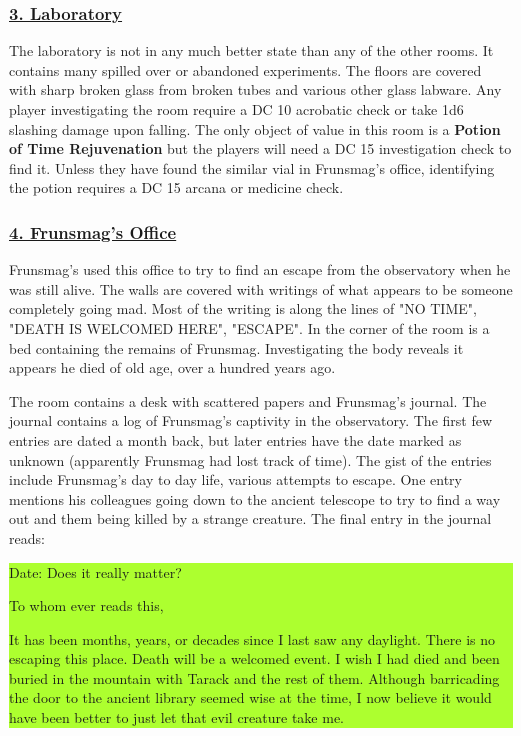 \documentclass{article}
\begin{document}
\begin{multicols*}{2}
	\subsubsection*{\underline{3. Laboratory}}
	The laboratory is not in any much better state than any of the other rooms. It contains many spilled over or abandoned experiments. The floors are covered with sharp broken glass from broken tubes and various other glass labware. Any player investigating the room require a DC 10 acrobatic check or take 1d6 slashing damage upon falling. The only object of value in this room is a \textbf{Potion of Time Rejuvenation} but the players will need a DC 15 investigation check to find it. Unless they have found the similar vial in Frunsmag's office, identifying the potion requires a DC 15 arcana or medicine check. 
	
	\subsubsection*{\underline{4. Frunsmag's Office}}
	Frunsmag's used this office to try to find an escape from the observatory when he was still alive. The walls are covered with writings of what appears to be someone completely going mad. Most of the writing is along the lines of "NO TIME", "DEATH IS WELCOMED HERE", "ESCAPE". In the corner of the room is a bed containing the remains of Frunsmag. Investigating the body reveals it appears he died of old age, over a hundred years ago.
	
	The room contains a desk with scattered papers and Frunsmag's journal. The journal contains a log of Frunsmag's captivity in the observatory. The first few entries are dated a month back, but later entries have the date marked as unknown (apparently Frunsmag had lost track of time). The gist of the entries include Frunsmag's day to day life, various attempts to escape. One entry mentions his colleagues going down to the ancient telescope to try to find a way out and them being killed by a strange creature. The final entry in the journal reads:
	
	\colorbox{GreenYellow}{\begin{minipage}{0.4\textwidth}
			Date: Does it really matter?
			
			To whom ever reads this,
			
			It has been months, years, or decades since I last saw any daylight. There is no escaping this place. Death will be a welcomed event. I wish I had died and been buried in the mountain with Tarack and the rest of them. Although barricading the door to the ancient library seemed wise at the time, I now believe it would have been better to just let that evil creature take me.
			

\end{minipage}}
\end{multicols*}
\end{document}
